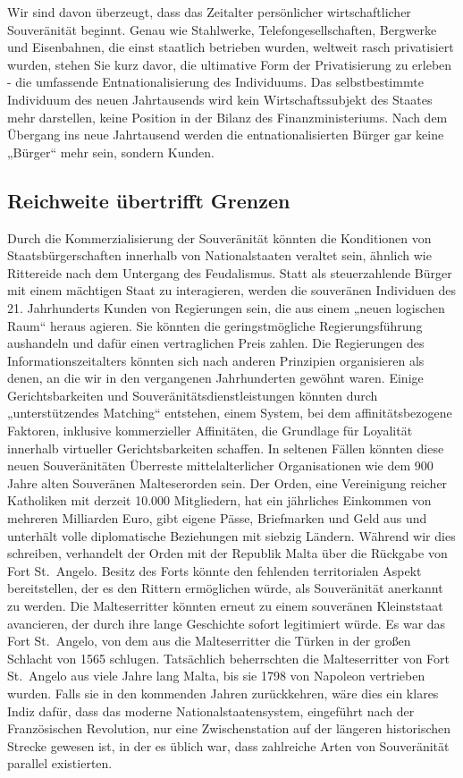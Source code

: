 \documentclass[
  a5paper,
  smalldemyvopaper,10pt,twoside,onecolumn,openright,extrafontsizes,hidelinks]{memoir}
\begin{document}
Wir sind davon überzeugt, dass das Zeitalter persönlicher
wirtschaftlicher Souveränität beginnt. Genau wie Stahlwerke,
Telefongesellschaften, Bergwerke und Eisenbahnen, die einst staatlich
betrieben wurden, weltweit rasch privatisiert wurden, stehen Sie kurz
davor, die ultimative Form der Privatisierung zu erleben - die
umfassende Entnationalisierung des Individuums. Das selbstbestimmte
Individuum des neuen Jahrtausends wird kein Wirtschaftssubjekt des
Staates mehr darstellen, keine Position in der Bilanz des
Finanzministeriums. Nach dem Übergang ins neue Jahrtausend werden die
entnationalisierten Bürger gar keine „Bürger`` mehr sein, sondern
Kunden.

\subsection{Reichweite übertrifft
Grenzen}\label{reichweite-uxfcbertrifft-grenzen}

Durch die Kommerzialisierung der Souveränität könnten die Konditionen
von Staatsbürgerschaften innerhalb von Nationalstaaten veraltet sein,
ähnlich wie Rittereide nach dem Untergang des Feudalismus. Statt als
steuerzahlende Bürger mit einem mächtigen Staat zu interagieren, werden
die souveränen Individuen des 21. Jahrhunderts Kunden von Regierungen
sein, die aus einem „neuen logischen Raum`` heraus agieren. Sie könnten
die geringstmögliche Regierungsführung aushandeln und dafür einen
vertraglichen Preis zahlen. Die Regierungen des Informationszeitalters
könnten sich nach anderen Prinzipien organisieren als denen, an die wir
in den vergangenen Jahrhunderten gewöhnt waren. Einige Gerichtsbarkeiten
und Souveränitätsdienstleistungen könnten durch „unterstützendes
Matching`` entstehen, einem System, bei dem affinitätsbezogene Faktoren,
inklusive kommerzieller Affinitäten, die Grundlage für Loyalität
innerhalb virtueller Gerichtsbarkeiten schaffen. In seltenen Fällen
könnten diese neuen Souveränitäten Überreste mittelalterlicher
Organisationen wie dem 900 Jahre alten Souveränen Malteserorden sein.
Der Orden, eine Vereinigung reicher Katholiken mit derzeit 10.000
Mitgliedern, hat ein jährliches Einkommen von mehreren Milliarden Euro,
gibt eigene Pässe, Briefmarken und Geld aus und unterhält volle
diplomatische Beziehungen mit siebzig Ländern. Während wir dies
schreiben, verhandelt der Orden mit der Republik Malta über die Rückgabe
von Fort St.~Angelo. Besitz des Forts könnte den fehlenden territorialen
Aspekt bereitstellen, der es den Rittern ermöglichen würde, als
Souveränität anerkannt zu werden. Die Malteserritter könnten erneut zu
einem souveränen Kleinststaat avancieren, der durch ihre lange
Geschichte sofort legitimiert würde. Es war das Fort St.~Angelo, von dem
aus die Malteserritter die Türken in der großen Schlacht von 1565
schlugen. Tatsächlich beherrschten die Malteserritter von Fort
St.~Angelo aus viele Jahre lang Malta, bis sie 1798 von Napoleon
vertrieben wurden. Falls sie in den kommenden Jahren zurückkehren, wäre
dies ein klares Indiz dafür, dass das moderne Nationalstaatensystem,
eingeführt nach der Französischen Revolution, nur eine Zwischenstation
auf der längeren historischen Strecke gewesen ist, in der es üblich war,
dass zahlreiche Arten von Souveränität parallel existierten.
\end{document}
